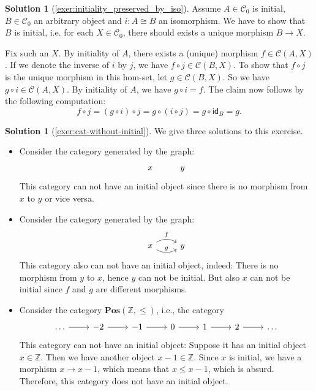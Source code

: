 \documentclass[a4paper,11pt, oneside,titlepage=false]{scrbook}
\theoremstyle{plain}
\theoremstyle{definition}
\newtheorem{solution}[thm]{Solution}
\newcommand{\cfont}[1]{\ensuremath{\mathsf{#1}}}
\newcommand{\Cat}[1]{\mathcal{#1}}
\newcommand{\CC}{\Cat{C}}
\newcommand{\Catb}[1]{\mathbf{#1}}
\newcommand{\POS}{\Catb{Pos}}
\newcommand{\Ob}[1]{{#1}_0}
\newcommand{\CHom}[3]{{#1}(#2,#3)}
\newcommand{\Id}[1][]{\cfont{id}_{#1}}
\newcommand{\co}[2]{\ensuremath{#2 \circ #1}}
\begin{document}
\begin{solution}[\cref{exer:initiality_preserved_by_iso}]\label{sol:initiality_preserved_by_iso}
Assume $A\in \Ob{\CC}$ is initial, $B\in\Ob{\CC}$ an arbitrary object and $i:A\cong B$ an isomorphism. We have to show that $B$ is initial, i.e. for each $X\in\Ob{\CC}$, there should exists a unique morphism $B\to X$.

Fix such an $X$. By initiality of $A$, there exists a (unique) morphism $f\in \CHom{\CC}{A}{X}$. If we denote the inverse of $i$ by $j$, we have $\co{j}{f} \in\CHom{\CC}{B}{X}$. To show that $\co{j}{f}$ is the unique morphism in this hom-set, let $g\in \CHom{\CC}{B}{X}$. So we have $\co{i}{g} \in \CHom{\CC}{A}{X}$. By initiality of $A$, we have $\co{i}{g} = f$. The claim now follows by the following computation:
\[
\co{j}{f} = \co{j}{(\co{i}{g})} = \co{(\co{j}{i})}{g} = \co{\Id[B]}{g} = g.
\]
\end{solution}

\begin{solution}[\cref{exer:cat-without-initial}]\label{sol:cat-without-initial}
We give three solutions to this exercise.
\begin{itemize}
\item Consider the category generated by the graph:
\[
\begin{tikzcd}
x & y
\end{tikzcd}
\]
This category can not have an initial object since there is no morphism from $x$ to $y$ or vice versa.
\item Consider the category generated by the graph:
\[
\begin{tikzcd}
x \arrow[r, bend left, "f"] \arrow[r, bend right, "g"] & y
\end{tikzcd}
\]
This category also can not have an initial object, indeed: There is no morphism from $y$ to $x$, hence $y$ can not be initial. But also $x$ can not be initial since $f$ and $g$ are different morphisms.
\item Consider the category $ \POS(\mathbb Z, \leq) $, i.e., the category
\[
\begin{tikzcd}
	\dots \arrow[r] & -2 \arrow[r] & -1 \arrow[r] & 0 \arrow[r] & 1 \arrow[r] & 2 \arrow[r] & \dots
\end{tikzcd}
\]
This category can not have an initial object: Suppose it has an initial object $ x \in \mathbb Z $. Then we have another object $ x - 1 \in \mathbb Z $. Since $ x $ is initial, we have a morphism $ x \to x - 1 $, which means that $ x \leq x - 1 $, which is absurd. Therefore, this category does not have an initial object.
\end{itemize}
\end{solution}
\end{document}
